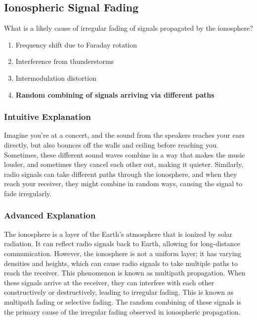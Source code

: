 \subsection{Ionospheric Signal Fading}
\label{T3A08}

\begin{tcolorbox}[colback=gray!10!white,colframe=black!75!black,title=T3A08]
What is a likely cause of irregular fading of signals propagated by the ionosphere?
\begin{enumerate}[noitemsep]
    \item Frequency shift due to Faraday rotation
    \item Interference from thunderstorms
    \item Intermodulation distortion
    \item \textbf{Random combining of signals arriving via different paths}
\end{enumerate}
\end{tcolorbox}

\subsubsection*{Intuitive Explanation}
Imagine you're at a concert, and the sound from the speakers reaches your ears directly, but also bounces off the walls and ceiling before reaching you. Sometimes, these different sound waves combine in a way that makes the music louder, and sometimes they cancel each other out, making it quieter. Similarly, radio signals can take different paths through the ionosphere, and when they reach your receiver, they might combine in random ways, causing the signal to fade irregularly.

\subsubsection*{Advanced Explanation}
The ionosphere is a layer of the Earth's atmosphere that is ionized by solar radiation. It can reflect radio signals back to Earth, allowing for long-distance communication. However, the ionosphere is not a uniform layer; it has varying densities and heights, which can cause radio signals to take multiple paths to reach the receiver. This phenomenon is known as multipath propagation. When these signals arrive at the receiver, they can interfere with each other constructively or destructively, leading to irregular fading. This is known as multipath fading or selective fading. The random combining of these signals is the primary cause of the irregular fading observed in ionospheric propagation.